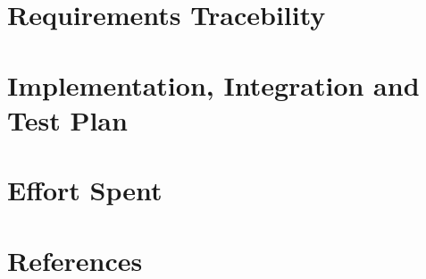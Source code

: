 \documentclass[fontsize=11pt,paper=a4,pagesize=auto]{report}
\begin{document}
\chapter{Requirements Tracebility}




\chapter{Implementation, Integration and Test Plan}



\chapter{Effort Spent}

\chapter{References}
\end{document}
